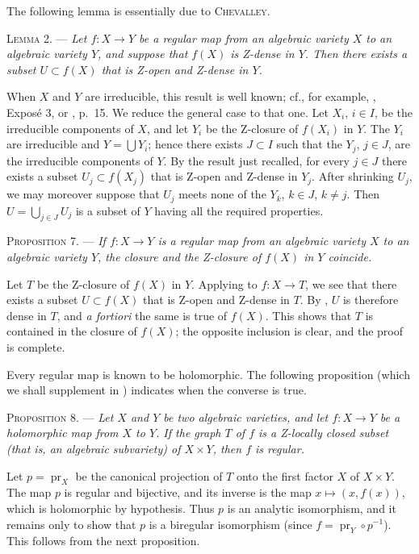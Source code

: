 The following lemma is essentially due to \textsc{Chevalley}.

\textsc{Lemma 2}. --- \emph{Let $f:X\to Y$ be a regular map from an algebraic variety $X$ to an algebraic variety $Y$, and suppose that $f(X)$ is Z-dense in $Y$. Then there exists a subset $U\subset f(X)$ that is Z-open and Z-dense in $Y$.}

When $X$ and $Y$ are irreducible, this result is well known; cf., for example, , Expos\'e 3, or , p.~15. We reduce the general case to that one. Let $X_i$, $i\in I$, be the irreducible components of $X$, and let $Y_i$ be the Z-closure of $f(X_i)$ in $Y$. The $Y_i$ are irreducible and $Y=\bigcup Y_i$; hence there exists $J\subset I$ such that the $Y_j$, $j\in J$, are the irreducible components of $Y$. By the result just recalled, for every $j\in J$ there exists a subset $U_j\subset f(X_j)$ that is Z-open and Z-dense in $Y_j$. After shrinking $U_j$, we may moreover suppose that $U_j$ meets none of the $Y_k$, $k\in J$, $k\neq j$. Then $U=\bigcup_{j\in J}U_j$ is a subset of $Y$ having all the required properties.

\textsc{Proposition 7}. --- \emph{If $f:X\to Y$ is a regular map from an algebraic variety $X$ to an algebraic variety $Y$, the closure and the Z-closure of $f(X)$ in $Y$ coincide.}

Let $T$ be the Z-closure of $f(X)$ in $Y$. Applying  to $f:X\to T$, we see that there exists a subset $U\subset f(X)$ that is Z-open and Z-dense in $T$. By , $U$ is therefore dense in $T$, and \emph{a fortiori} the same is true of $f(X)$. This shows that $T$ is contained in the closure of $f(X)$; the opposite inclusion is clear, and the proof is complete.


Every regular map is known to be holomorphic. The following proposition (which we shall supplement in ) indicates when the converse is true.

\textsc{Proposition 8}. --- \emph{Let $X$ and $Y$ be two algebraic varieties, and let $f:X\to Y$ be a holomorphic map from $X$ to $Y$. If the graph $T$ of $f$ is a Z-locally closed subset (that is, an algebraic subvariety) of $X\times Y$, then $f$ is regular.}

Let $p=\operatorname{pr}_X$ be the canonical projection of $T$ onto the first factor $X$ of $X\times Y$. The map $p$ is regular and bijective, and its inverse is the map $x\mapsto(x,f(x))$, which is holomorphic by hypothesis. Thus $p$ is an analytic isomorphism, and it remains only to show that $p$ is a biregular isomorphism (since $f=\operatorname{pr}_Y\circ p^{-1}$). This follows from the next proposition.

